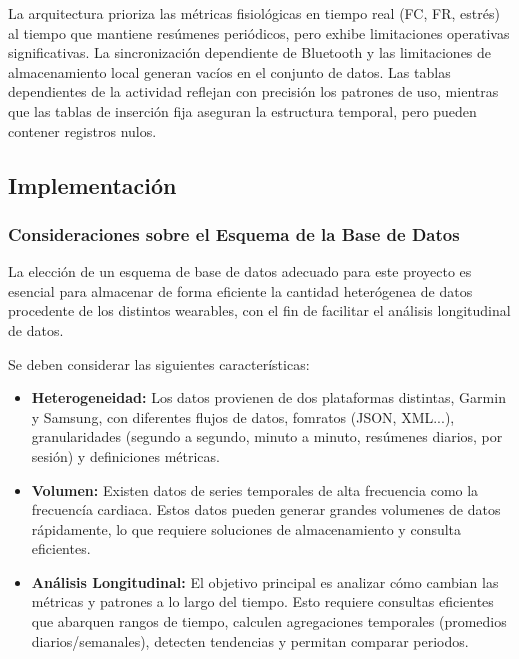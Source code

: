 La arquitectura prioriza las métricas fisiológicas en tiempo real (FC, FR, estrés) al tiempo que mantiene resúmenes periódicos, pero exhibe limitaciones operativas significativas. La sincronización dependiente de Bluetooth y las limitaciones de almacenamiento local generan vacíos en el conjunto de datos. Las tablas dependientes de la actividad reflejan con precisión los patrones de uso, mientras que las tablas de inserción fija aseguran la estructura temporal, pero pueden contener registros nulos.
\subsection{Implementación}

\subsubsection{Consideraciones sobre el Esquema de la Base de Datos}
La elección de un esquema de base de datos adecuado para este proyecto es esencial para almacenar de forma eficiente la cantidad heterógenea de datos procedente de los distintos wearables, con el fin de facilitar el análisis longitudinal de datos. 


Se deben considerar las siguientes características:
\begin{itemize}
    \item \textbf{Heterogeneidad:} Los datos provienen de dos plataformas distintas, Garmin y Samsung, con diferentes flujos de datos, fomratos (JSON, XML...), granularidades (segundo a segundo, minuto a minuto, resúmenes diarios, por sesión) y definiciones métricas.
    \item \textbf{Volumen:} Existen datos de series temporales de alta frecuencia como la frecuencía cardiaca. Estos datos pueden generar grandes volumenes de datos rápidamente, lo que requiere soluciones de almacenamiento y consulta eficientes.
    \item \textbf{Análisis Longitudinal:} El objetivo principal es analizar cómo cambian las métricas y patrones a lo largo del tiempo. Esto requiere consultas eficientes que abarquen rangos de tiempo, calculen agregaciones temporales (promedios diarios/semanales), detecten tendencias y permitan comparar periodos.
\end{itemize}


